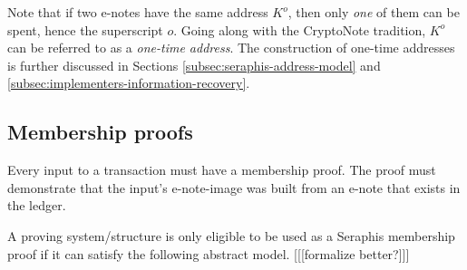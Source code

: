 Note that if two e-notes have the same address $K^o$, then only {\em one} of them can be spent, hence the superscript $o$. Going along with the CryptoNote tradition, $K^o$ can be referred to as a {\em one-time address}. The construction of one-time addresses is further discussed in Sections \ref{subsec:seraphis-address-model} and \ref{subsec:implementers-information-recovery}.


\subsection{Membership proofs}
\label{subsec:seraphis-membership proofs}

Every input to a transaction must have a membership proof. The proof must demonstrate that the input's e-note-image was built from an e-note that exists in the ledger.

A proving system/structure is only eligible to be used as a Seraphis membership proof if it can satisfy the following abstract model. [[[formalize better?]]]

